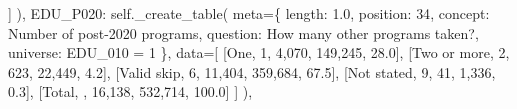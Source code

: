 \documentclass[
  11pt,
  a4paper,
]{article}
\newenvironment{Shaded}{\begin{snugshade}}{\end{snugshade}}
\newcommand{\NormalTok}[1]{\textcolor[rgb]{0.00,0.23,0.31}{#1}}
\newcommand{\OperatorTok}[1]{\textcolor[rgb]{0.37,0.37,0.37}{#1}}
\newcommand{\StringTok}[1]{\textcolor[rgb]{0.13,0.47,0.30}{#1}}
\newcommand{\VariableTok}[1]{\textcolor[rgb]{0.07,0.07,0.07}{#1}}
\begin{document}
\begin{Shaded}
\begin{Highlighting}[]
\NormalTok{                ]}
\NormalTok{            ),}
            \StringTok{\textquotesingle{}EDU\_P020\textquotesingle{}}\NormalTok{: }\VariableTok{self}\NormalTok{.\_create\_table(}
\NormalTok{                meta}\OperatorTok{=}\NormalTok{\{}
                    \StringTok{\textquotesingle{}length\textquotesingle{}}\NormalTok{: }\StringTok{\textquotesingle{}1.0\textquotesingle{}}\NormalTok{, }\StringTok{\textquotesingle{}position\textquotesingle{}}\NormalTok{: }\StringTok{\textquotesingle{}34\textquotesingle{}}\NormalTok{,}
                    \StringTok{\textquotesingle{}concept\textquotesingle{}}\NormalTok{: }\StringTok{\textquotesingle{}Number of post{-}2020 programs\textquotesingle{}}\NormalTok{,}
                    \StringTok{\textquotesingle{}question\textquotesingle{}}\NormalTok{: }\StringTok{\textquotesingle{}How many other programs taken?\textquotesingle{}}\NormalTok{,}
                    \StringTok{\textquotesingle{}universe\textquotesingle{}}\NormalTok{: }\StringTok{\textquotesingle{}EDU\_010 = 1\textquotesingle{}}
\NormalTok{                \},}
\NormalTok{                data}\OperatorTok{=}\NormalTok{[}
\NormalTok{                    [}\StringTok{\textquotesingle{}One\textquotesingle{}}\NormalTok{, }\StringTok{\textquotesingle{}1\textquotesingle{}}\NormalTok{, }\StringTok{\textquotesingle{}4,070\textquotesingle{}}\NormalTok{, }\StringTok{\textquotesingle{}149,245\textquotesingle{}}\NormalTok{, }\StringTok{\textquotesingle{}28.0\textquotesingle{}}\NormalTok{],}
\NormalTok{                    [}\StringTok{\textquotesingle{}Two or more\textquotesingle{}}\NormalTok{, }\StringTok{\textquotesingle{}2\textquotesingle{}}\NormalTok{, }\StringTok{\textquotesingle{}623\textquotesingle{}}\NormalTok{, }\StringTok{\textquotesingle{}22,449\textquotesingle{}}\NormalTok{, }\StringTok{\textquotesingle{}4.2\textquotesingle{}}\NormalTok{],}
\NormalTok{                    [}\StringTok{\textquotesingle{}Valid skip\textquotesingle{}}\NormalTok{, }\StringTok{\textquotesingle{}6\textquotesingle{}}\NormalTok{, }\StringTok{\textquotesingle{}11,404\textquotesingle{}}\NormalTok{, }\StringTok{\textquotesingle{}359,684\textquotesingle{}}\NormalTok{, }\StringTok{\textquotesingle{}67.5\textquotesingle{}}\NormalTok{],}
\NormalTok{                    [}\StringTok{\textquotesingle{}Not stated\textquotesingle{}}\NormalTok{, }\StringTok{\textquotesingle{}9\textquotesingle{}}\NormalTok{, }\StringTok{\textquotesingle{}41\textquotesingle{}}\NormalTok{, }\StringTok{\textquotesingle{}1,336\textquotesingle{}}\NormalTok{, }\StringTok{\textquotesingle{}0.3\textquotesingle{}}\NormalTok{],}
\NormalTok{                    [}\StringTok{\textquotesingle{}Total\textquotesingle{}}\NormalTok{, }\StringTok{\textquotesingle{}\textquotesingle{}}\NormalTok{, }\StringTok{\textquotesingle{}16,138\textquotesingle{}}\NormalTok{, }\StringTok{\textquotesingle{}532,714\textquotesingle{}}\NormalTok{, }\StringTok{\textquotesingle{}100.0\textquotesingle{}}\NormalTok{]}
\NormalTok{                ]}
\NormalTok{            ),}


\end{Highlighting}
\end{Shaded}
\end{document}
